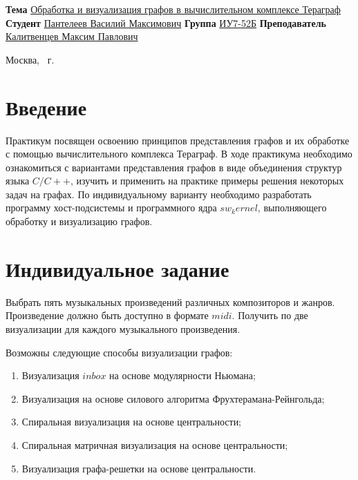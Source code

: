 \documentclass{article}
\begin{document}
\begin{titlepage}
	\noindent\begin{minipage}{1.0\textwidth}\centering
		\Large\textbf{\newline\newline\newline\newline}	
		\end{minipage}
	
	\noindent\textbf{Тема} \underline{Обработка и визуализация графов в вычислительном комплексе Тераграф}
\newline\newline
	\textbf{Студент} \underline{Пантелеев Василий Максимович}\newline\newline
	\textbf{Группа} \underline{ИУ7-52Б}\newline\newline
	\textbf{Преподаватель} \underline{Калитвенцев Максим Павлович}
	
	\begin{center}
		\vfill
		Москва, \the\year ~г.
	\end{center}
	\restoregeometry
	\clearpage
\end{titlepage}

\section{Введение}

Практикум посвящен освоению принципов представления графов и их обработке с помощью вычислительного комплекса 
Тераграф. В ходе практикума необходимо ознакомиться с вариантами представления графов в виде объединения структур языка 
$C/C++$, изучить и применить на практике примеры решения некоторых задач на графах. По индивидуальному варианту 
необходимо разработать программу хост-подсистемы и программного ядра $sw_kernel$, выполняющего обработку и 
визуализацию графов.

\clearpage\section{Индивидуальное задание}

Выбрать пять музыкальных произведений различных композиторов и жанров. Произведение должно быть доступно в формате 
$midi$. Получить по две визуализации для каждого музыкального произведения. 

Возможны следующие способы визуализации графов:
\begin{enumerate}
	\item Визуализация $inbox$ на основе модулярности Ньюмана;
	\item Визуализация на основе силового алгоритма Фрухтерамана-Рейнгольда;
	\item Спиральная визуализация на основе центральности;
	\item Спиральная матричная визуализация на основе центральности;
	\item Визуализация графа-решетки на основе центральности.
\end{enumerate}
\end{document}
